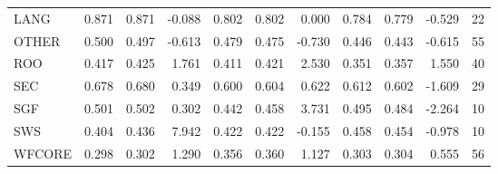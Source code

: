 \begin{tabular}{lrrrrrrrrrr}
LANG      & 0.871 &     0.871 &               -0.088 &     0.802 &         0.802 &                    0.000 &       0.784 &           0.779 &                     -0.529 &     22 \\
OTHER     & 0.500 &     0.497 &               -0.613 &     0.479 &         0.475 &                   -0.730 &       0.446 &           0.443 &                     -0.615 &     55 \\
ROO       & 0.417 &     0.425 &                1.761 &     0.411 &         0.421 &                    2.530 &       0.351 &           0.357 &                      1.550 &     40 \\
SEC       & 0.678 &     0.680 &                0.349 &     0.600 &         0.604 &                    0.622 &       0.612 &           0.602 &                     -1.609 &     29 \\
SGF       & 0.501 &     0.502 &                0.302 &     0.442 &         0.458 &                    3.731 &       0.495 &           0.484 &                     -2.264 &     10 \\
SWS       & 0.404 &     0.436 &                7.942 &     0.422 &         0.422 &                   -0.155 &       0.458 &           0.454 &                     -0.978 &     10 \\
WFCORE    & 0.298 &     0.302 &                1.290 &     0.356 &         0.360 &                    1.127 &       0.303 &           0.304 &                      0.555 &     56 \\
\bottomrule
\end{tabular}
